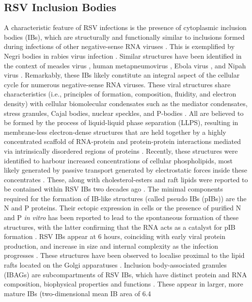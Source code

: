 \subsection{RSV Inclusion Bodies} \label{subsec:RSV Inclusion Bodies}
A characteristic feature of RSV infections is the presence of cytoplasmic inclusion bodies (IBs), which are structurally and functionally similar to inclusions formed during infections of other negative-sense RNA viruses \cite{Fricke2013P38Assembly, Rincheval2017FunctionalVirus, Li2022PhaseInfections}. This is exemplified by Negri bodies in rabies virus infection \cite{Nikolic2017NegriOrganelles, Nevers2020NegriCompartments}. Similar structures have been identified in the context of measles virus \cite{Zhou2019MeaslesOrganelles}, human metapneumovirus \cite{Cifuentes-Munoz2017HumanTranscription}, Ebola virus \cite{Hoenen2012InclusionReplication}, and Nipah virus \cite{Ringel2019NipahMembrane}. Remarkably, these IBs likely constitute an integral aspect of the cellular cycle for numerous negative-sense RNA viruses. These viral structures share characteristics (i.e., principles of formation, composition, fluidity, and electron density) with cellular biomolecular condensates such as the mediator condensates, stress granules, Cajal bodies, nuclear speckles, and P-bodies \cite{Dumelie2023BiomolecularMicroenvironments, Garabedian2022ProteinSequences, Darling2023KnownCondensates, Li2022PhaseInfections}. All are believed to be formed by the process of liquid-liquid phase separation (LLPS), resulting in membrane-less electron-dense structures that are held together by a highly concentrated scaffold of RNA-protein and protein-protein interactions mediated via intrinsically disordered regions of proteins \cite{Mohanty2022PrinciplesProteins, Hu2022SequestrationPathological}. Recently, these structures were identified to harbour increased concentrations of cellular phospholipids, most likely generated by passive transport generated by electrostatic forces inside these concentrates \cite{Dumelie2023BiomolecularMicroenvironments}. These, along with cholesterol-esters and raft lipids were reported to be contained within RSV IBs two decades ago \cite{Brown2005EvidenceInfection}. The minimal components required for the formation of IB-like structures (called pseudo IBs (pIBs)) are the N and P proteins. Their ectopic expression in cells or the presence of purified N and P \textit{in vitro} has been reported to lead to the spontaneous formation of these structures, with the latter confirming that the RNA acts as a catalyst for pIB formation \cite{Rincheval2017FunctionalVirus, Galloux2020MinimalVitro}. RSV IBs appear at 6 hours, coinciding with early viral protein production, and increase in size and internal complexity as the infection progresses \cite{Risso-Ballester2023SpatialBodies, Rincheval2017FunctionalVirus}. These structures have been observed to localise proximal to the lipid rafts located on the Golgi apparatuses \cite{McDonald2004EvidenceAnalysis}. Inclusion body-associated granules (IBAGs) are subcompartments of RSV IBs, which have distinct protein and RNA composition, biophysical properties and functions \cite{Rincheval2017FunctionalVirus, Jobe2020RespiratorySignaling}. These appear in larger, more mature IBs (two-dimensional mean IB area of 6.4 
